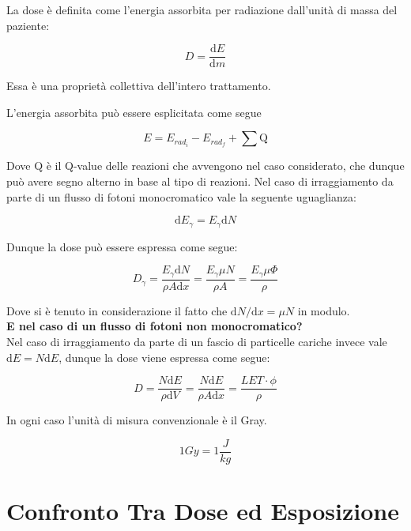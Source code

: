 \documentclass [a4paper, twoside] {book}
\begin{document}
La dose è definita come l'energia assorbita per radiazione dall'unità di massa del paziente:

\begin{equation}
D=\frac{\mathrm{d}E}{\mathrm{d}m}
\end{equation}

Essa è una proprietà collettiva dell'intero trattamento.

L'energia assorbita può essere esplicitata come segue

\begin{equation}
E=E_{rad_{i}}-E_{rad_{f}}+\sum \text{Q}
\end{equation}

Dove Q è il Q-value delle reazioni che avvengono nel caso considerato, che dunque può avere segno alterno in base al tipo di reazioni. Nel caso di irraggiamento da parte di un flusso di fotoni monocromatico vale la seguente uguaglianza:

\begin{equation}
\mathrm{d}E_{\gamma}=E_{\gamma}\mathrm{d}N
\end{equation}

Dunque la dose può essere espressa come segue:

\begin{equation}
D_{\gamma}=\frac{E_{\gamma}\mathrm{d}N}{\rho A\mathrm{d}x}=\frac{E_{\gamma}\mu N}{\rho A}=\frac{E_{\gamma}\mu \Phi}{\rho} 
\end{equation}

Dove si è tenuto in considerazione il fatto che $\mathrm{d}N/\mathrm{d}x=\mu N$ in modulo.\\

\textbf{E nel caso di un flusso di fotoni non monocromatico?}\\

Nel caso di irraggiamento da parte di un fascio di particelle cariche invece vale $\mathrm{d}E=N\mathrm{d}E$, dunque la dose viene espressa come segue:

\begin{equation}
D=\frac{N\mathrm{d}E}{\rho \mathrm{d}V}=\frac{N\mathrm{d}E}{\rho A \mathrm{d}x}=\frac{LET\cdot\phi}{\rho}
\end{equation}

In ogni caso l'unità di misura convenzionale è il Gray.

\begin{equation}
1 Gy = 1 \frac{J}{kg}
\end{equation}

\section{Confronto Tra Dose ed Esposizione}
\end{document}
